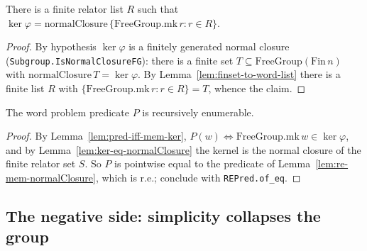 \begin{lemma}
    \label{lem:ker-eq-normalClosure}
    \leanok
    There is a finite relator list $R$ such that
    $\ker\varphi = \mathrm{normalClosure}\,\{\mathrm{FreeGroup.mk}\,r : r \in R\}$.
\end{lemma}
\begin{proof}
    By hypothesis $\ker\varphi$ is a finitely generated normal closure
    (\texttt{Subgroup.IsNormalClosureFG}): there is a finite set
    $T \subseteq \mathrm{FreeGroup}(\mathrm{Fin}\,n)$ with
    $\mathrm{normalClosure}\,T = \ker\varphi$. By
    Lemma~\ref{lem:finset-to-word-list} there is a finite list $R$ with
    $\{\mathrm{FreeGroup.mk}\,r : r \in R\} = T$, whence the claim.
\end{proof}

\begin{lemma}
    \label{lem:re-positive}
    \leanok
    The word problem predicate $P$ is recursively enumerable.
\end{lemma}
\begin{proof}
    By Lemma~\ref{lem:pred-iff-mem-ker}, $P(w) \Leftrightarrow
    \mathrm{FreeGroup.mk}\,w \in \ker\varphi$, and by
    Lemma~\ref{lem:ker-eq-normalClosure} the kernel is the normal closure of the
    finite relator set $S$. So $P$ is pointwise equal to the predicate of
    Lemma~\ref{lem:re-mem-normalClosure}, which is r.e.; conclude with
    \texttt{REPred.of\_eq}.
\end{proof}

\subsection{The negative side: simplicity collapses the group}

